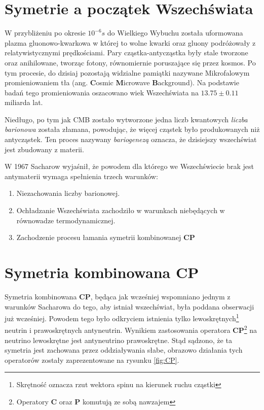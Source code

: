 \section{Symetrie a początek Wszechświata}
W przybliżeniu po okresie $10^{-6}s$ do Wielkiego Wybuchu została uformowana plazma gluonowo-kwarkowa w której to wolne kwarki oraz gluony podróżowały z relatywistycznymi prędkościami. Pary cząstka-antycząstka były stale tworzone oraz anihilowane, tworząc fotony, równomiernie poruszające się przez kosmos. Po tym procesie, do dzisiaj pozostają widzialne pamiątki nazywane Mikrofalowym promieniowaniem tła (ang. \textbf{C}osmic \textbf{M}icrowave \textbf{B}ackground). Na podstawie badań tego promieniowania oszacowano wiek Wszechświata na $13.75 \pm 0.11$ miliarda lat.

Niedługo, po tym jak CMB zostało wytworzone jedna liczb kwantowych \textit{liczba barionowa} została złamana, powodując, że więcej cząstek było produkowanych niż antycząstek. Ten proces nazywany \textit{bariogenezą} oznacza, że dzisiejszy wszechświat jest zbudowany z materii.

W 1967 Sacharow  wyjaśnił, że powodem dla którego we Wszechświecie brak jest antymaterii wymaga spełnienia trzech warunków:
\begin{enumerate}
\item Niezachowania liczby barionowej. 
\item Ochładzanie Wszechświata zachodziło w warunkach niebędących w równowadze termodynamicznej. 
\item Zachodzenie procesu łamania symetrii kombinowanej \textbf{CP} 
\end{enumerate}

\section{Symetria kombinowana \textbf{CP}}
Symetria kombinowana \textbf{CP}, będąca jak wcześniej wspomniano jednym z warunków Sacharowa do tego, aby istniał wszechświat, była poddana obserwacji już wcześniej. Powodem tego było odkryciem istnienia tylko lewoskrętnych\footnote{Skrętność oznacza rzut wektora spinu na kierunek ruchu cząstki} neutrin i prawoskrętnych antyneutrin. Wynikiem zastosowania operatora \textbf{CP}\footnote{Operatory \textbf{C} oraz \textbf{P} komutują ze sobą nawzajem} na neutrino lewoskrętne jest antyneutrino prawoskrętne. Stąd sądzono, że ta symetria jest zachowana przez oddziaływania słabe, obrazowo działania tych operatorów zostały zaprezentowane na rysunku \ref{fig:CP}.


